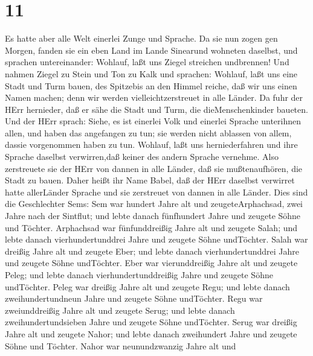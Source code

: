 \hypertarget{section-10}{%
\section{11}\label{section-10}}

 Es hatte aber alle Welt einerlei Zunge und Sprache.
 Da sie nun zogen gen Morgen, fanden sie ein eben Land im
Lande Sinearund wohneten daselbst,  und sprachen
untereinander: Wohlauf, laßt uns Ziegel streichen undbrennen! Und nahmen
Ziegel zu Stein und Ton zu Kalk  und sprachen: Wohlauf, laßt
uns eine Stadt und Turm bauen, des Spitzebis an den Himmel reiche, daß
wir uns einen Namen machen; denn wir werden vielleichtzerstreuet in alle
Länder.  Da fuhr der HErr hernieder, daß er sähe die Stadt
und Turm, die dieMenschenkinder baueten.  Und der HErr
sprach: Siehe, es ist einerlei Volk und einerlei Sprache unterihnen
allen, und haben das angefangen zu tun; sie werden nicht ablassen von
allem, dassie vorgenommen haben zu tun.  Wohlauf, laßt uns
herniederfahren und ihre Sprache daselbst verwirren,daß keiner des
andern Sprache vernehme.  Also zerstreuete sie der HErr von
dannen in alle Länder, daß sie mußtenaufhören, die Stadt zu bauen.
 Daher heißt ihr Name Babel, daß der HErr daselbst verwirret
hatte allerLänder Sprache und sie zerstreuet von dannen in alle Länder.
 Dies sind die Geschlechter Sems: Sem war hundert Jahre alt
und zeugeteArphachsad, zwei Jahre nach der Sintflut;  und
lebte danach fünfhundert Jahre und zeugete Söhne und Töchter.
 Arphachsad war fünfunddreißig Jahre alt und zeugete Salah;
 und lebte danach vierhundertunddrei Jahre und zeugete
Söhne undTöchter.  Salah war dreißig Jahre alt und zeugete
Eber;  und lebte danach vierhundertunddrei Jahre und
zeugete Söhne undTöchter.  Eber war vierunddreißig Jahre
alt und zeugete Peleg;  und lebte danach
vierhundertunddreißig Jahre und zeugete Söhne undTöchter. 
Peleg war dreißig Jahre alt und zeugete Regu;  und lebte
danach zweihundertundneun Jahre und zeugete Söhne undTöchter.
 Regu war zweiunddreißig Jahre alt und zeugete Serug;
 und lebte danach zweihundertundsieben Jahre und zeugete
Söhne undTöchter.  Serug war dreißig Jahre alt und zeugete
Nahor;  und lebte danach zweihundert Jahre und zeugete
Söhne und Töchter.  Nahor war neunundzwanzig Jahre alt und
